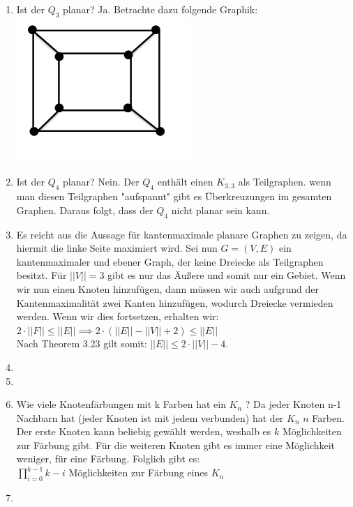 \begin{enumerate}[label=(\alph*)]
        \item Ist der $Q_3$ planar? 
        Ja. Betrachte dazu folgende Graphik:\\
        \includegraphics{Q3}
        
        \item Ist der $Q_4$ planar?
        Nein. Der $Q_4$ enthält einen $K_{3,3}$ als Teilgraphen. wenn man diesen Teilgraphen "aufspannt" 
        gibt es Überkreuzungen im gesamten Graphen. Daraus folgt, dass der $Q_4$ nicht planar sein kann.
        
        \item Es reicht aus die Aussage für kantenmaximale planare Graphen zu zeigen, da hiermit die 
        linke Seite maximiert wird. Sei nun $G=(V,E)$ ein kantenmaximaler und ebener Graph, der keine 
        Dreiecke als Teilgraphen besitzt. Für $||V||=3$ gibt es nur das Äußere und somit nur ein Gebiet. 
        Wenn wir nun einen Knoten hinzufügen, dann müssen wir auch aufgrund der Kantenmaximalität zwei 
        Kanten hinzufügen, wodurch Dreiecke vermieden werden.  Wenn wir dies fortsetzen, erhalten wir: \\ 
        $ 2 \cdot ||F|| \le ||E||\implies 2 \cdot \left(||E|| - ||V|| + 2 \right) \le ||E||$ \\ 
        Nach Theorem 3.23 gilt somit:
        $||E|| \le 2 \cdot ||V|| - 4 $. 
        
        \item
        
        \item

        \item Wie viele Knotenfärbungen mit k Farben hat ein $K_n$ ?
        Da jeder Knoten n-1 Nachbarn hat (jeder Knoten ist mit jedem verbunden) hat der $K_n$ $n$ Farben. 
        Der erste Knoten kann beliebig gewählt werden, weshalb es $k$ Möglichkeiten zur Färbung gibt. 
        Für die weiteren Knoten gibt es immer eine Möglichkeit weniger, für eine Färbung. Folglich gibt es: \\
        $\prod_{i=0}^{k-1} k - i$ Möglichkeiten zur Färbung eines $K_n$
          
        \item
        
    \end{enumerate}
